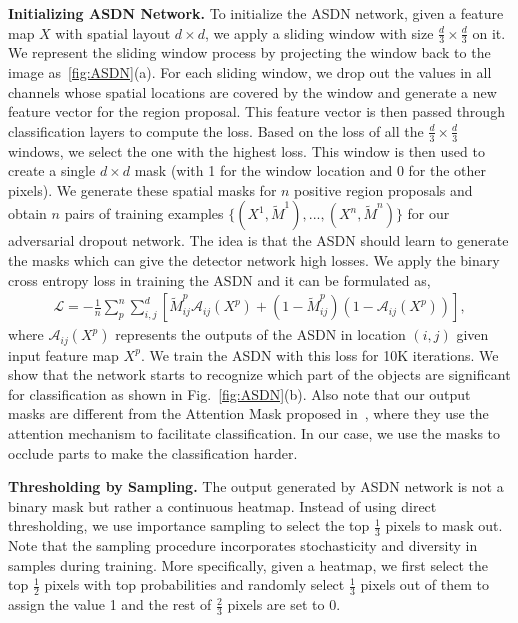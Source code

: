 \textbf{Initializing ASDN Network.} To initialize the ASDN network, given a feature map $X$ with spatial layout $d \times d$, we apply a sliding window with size $\frac{d}{3} \times \frac{d}{3}$ on it. We represent the sliding window process by projecting the window back to the image as~\ref{fig:ASDN}(a). For each sliding window, we drop out  the values in all channels whose spatial locations are covered by the window and generate a new feature vector for the region proposal. This feature vector is then passed through classification layers to compute the loss. Based on the loss of all the  $\frac{d}{3} \times \frac{d}{3}$ windows, we select the one with the highest loss. This window is then used to create a single $d \times d$ mask (with 1 for the window location and 0 for the other pixels). We generate these spatial masks for $n$ positive region proposals and obtain $n$ pairs of training examples $\{(X^{1}, \tilde{M}^{1}),..., (X^{n}, \tilde{M}^{n})\}$  for our adversarial dropout network. The idea is that the ASDN should learn to generate the masks which can give the detector network high losses. We apply the binary cross entropy loss in training the ASDN and it can be formulated as,
{\small
\begin{eqnarray}\label{eq:loss_mask}
\mathcal{L} =  - \frac{1}{n} \sum_{p}^{n} \sum_{i, j}^{d} [\tilde{M}_{ij}^p \mathcal{A}_{ij}(X^p) + (1 - \tilde{M}_{ij}^p) (1 - \mathcal{A}_{ij}(X^p)) ], 
\end{eqnarray}
}
where $\mathcal{A}_{ij}(X^p)$ represents the outputs of the ASDN in location $(i,j)$ given input feature map $X^p$. We train the ASDN with this loss for 10K iterations. We show that the network starts to recognize which part of the objects are significant for classification as shown in Fig.~\ref{fig:ASDN}(b). Also note that our output masks are different from the Attention Mask proposed in~\cite{ruslanattention}, where they use the attention mechanism to facilitate classification. In our case, we use the masks to occlude parts to make the classification harder. 




\textbf{Thresholding by Sampling.} The output generated by ASDN network is not a binary mask but rather a continuous heatmap. Instead of using direct  thresholding, we use importance sampling to select the top $\frac{1}{3}$ pixels to mask out. Note that the sampling procedure incorporates stochasticity and diversity in samples during training. More specifically, given a heatmap, we first select the top $\frac{1}{2}$ pixels with top probabilities and randomly select $\frac{1}{3}$ pixels out of them to assign the value 1 and the rest of $\frac{2}{3}$ pixels are set to 0. 





